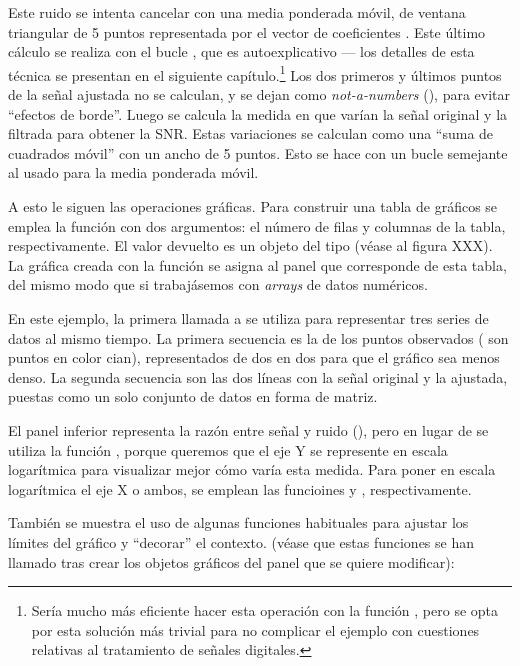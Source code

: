 ﻿\documentclass[spanish]{article}
\begin{document}
Este ruido se intenta cancelar con una media ponderada móvil, de
ventana triangular de 5 puntos representada por el vector de coeficientes
. Este último cálculo se realiza con el bucle , que
es autoexplicativo --- los detalles de esta técnica se presentan en  el
siguiente capítulo.\footnote{%
Sería mucho más eficiente hacer esta operación con la
función , pero se opta por esta solución más trivial para no
complicar el ejemplo con cuestiones relativas al tratamiento de señales digitales.}%
Los dos primeros y últimos puntos de la señal ajustada no se calculan, y se
dejan como \emph{not-a-numbers} (), para evitar ``efectos de borde''.
Luego se calcula la medida en que varían la señal original y la filtrada para obtener la
SNR. Estas variaciones se calculan como una
``suma de cuadrados móvil'' con un ancho de 5 puntos. Esto se hace con un bucle
semejante al usado para la media ponderada móvil.

A esto le siguen las operaciones gráficas. Para construir una tabla de gráficos se
emplea la función  con dos argumentos: el número de filas y
columnas de la tabla, respectivamente. El valor devuelto es un objeto del tipo
 (véase al figura XXX).
La gráfica creada con la función 
se asigna al panel que corresponde de esta tabla, del mismo modo que si
trabajásemos con \emph{arrays} de datos numéricos.

En este ejemplo, la primera llamada a  se utiliza para representar
tres series de datos al mismo tiempo. La primera secuencia es la de los puntos observados
( son puntos en color cian), representados de dos en dos para que el
gráfico sea menos denso. La segunda secuencia son las dos líneas con la señal original y
la ajustada, puestas como un solo conjunto de datos en forma de matriz.

El panel inferior representa la razón entre señal y ruido (), pero
en lugar de  se utiliza la función , porque
queremos que el eje Y se represente en escala logarítmica para visualizar mejor
cómo varía esta medida. Para poner en escala logarítmica el eje X o ambos,
se emplean las funcioines  y , respectivamente.

También se muestra el uso de algunas funciones habituales para ajustar
los límites del gráfico y ``decorar'' el contexto.
(véase que estas funciones se han llamado tras crear los objetos gráficos del
panel que se quiere modificar):
\end{document}
